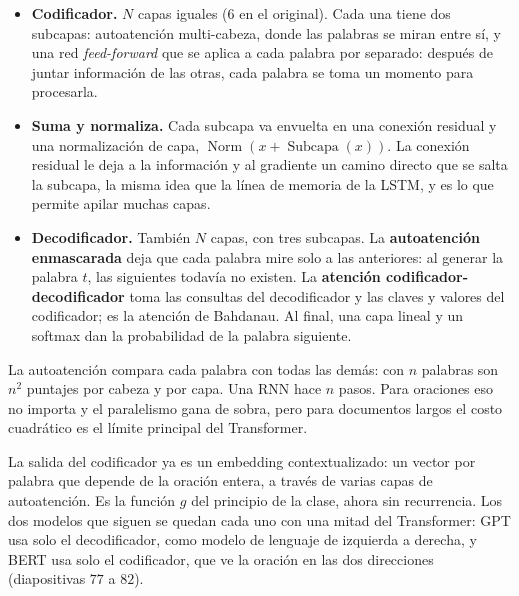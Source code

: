 \documentclass[11pt,letterpaper]{article}
\begin{document}
\begin{itemize}[itemsep=0.3em]
    \item \textbf{Codificador.} $N$ capas iguales ($6$ en el original).
          Cada una tiene dos subcapas: autoatención multi-cabeza, donde
          las palabras se miran entre sí, y una red
          \textit{feed-forward} que se aplica a cada palabra por
          separado: después de juntar información de las otras, cada
          palabra se toma un momento para procesarla.
    \item \textbf{Suma y normaliza.} Cada subcapa va envuelta en una
          conexión residual y una normalización de capa,
          $\operatorname{Norm}(x + \operatorname{Subcapa}(x))$. La
          conexión residual le deja a la información y al gradiente un
          camino directo que se salta la subcapa, la misma idea que la
          línea de memoria de la LSTM, y es lo que permite apilar
          muchas capas.
    \item \textbf{Decodificador.} También $N$ capas, con tres
          subcapas. La \textbf{autoatención enmascarada} deja que cada
          palabra mire solo a las anteriores: al generar la palabra
          $t$, las siguientes todavía no existen. La \textbf{atención
          codificador-decodificador} toma las consultas del
          decodificador y las claves y valores del codificador; es la
          atención de Bahdanau. Al final, una capa lineal y un softmax
          dan la probabilidad de la palabra siguiente.
\end{itemize}

\begin{ojo}
    La autoatención compara cada palabra con todas las demás: con $n$
    palabras son $n^2$ puntajes por cabeza y por capa. Una RNN hace $n$
    pasos. Para oraciones eso no importa y el paralelismo gana de
    sobra, pero para documentos largos el costo cuadrático es el
    límite principal del Transformer.
\end{ojo}

\begin{idea}
    La salida del codificador ya es un embedding contextualizado: un
    vector por palabra que depende de la oración entera, a través de
    varias capas de autoatención. Es la función $g$ del principio de la
    clase, ahora sin recurrencia. Los dos modelos que siguen se quedan
    cada uno con una mitad del Transformer: GPT usa solo el
    decodificador, como modelo de lenguaje de izquierda a derecha, y
    BERT usa solo el codificador, que ve la oración en las dos
    direcciones (diapositivas $77$ a $82$).
\end{idea}
\end{document}

